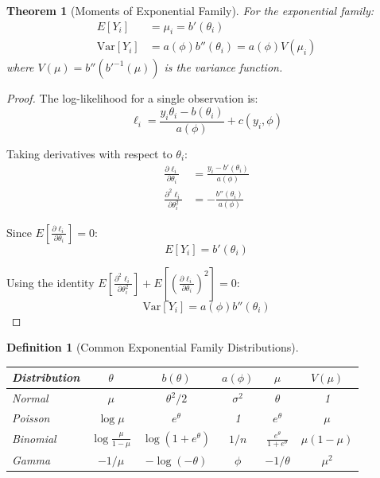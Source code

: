 \documentclass{article}
\newtheorem{definition}{Definition}
\newtheorem{theorem}{Theorem}
\begin{document}
\begin{theorem}[Moments of Exponential Family]
For the exponential family:
\begin{align}
E[Y_i] &= \mu_i = b'(\theta_i) \\
\text{Var}[Y_i] &= a(\phi)b''(\theta_i) = a(\phi)V(\mu_i)
\end{align}
where $V(\mu) = b''(b'^{-1}(\mu))$ is the variance function.
\end{theorem}

\begin{proof}
The log-likelihood for a single observation is:
\begin{equation}
\ell_i = \frac{y_i\theta_i - b(\theta_i)}{a(\phi)} + c(y_i, \phi)
\end{equation}

Taking derivatives with respect to $\theta_i$:
\begin{align}
\frac{\partial \ell_i}{\partial \theta_i} &= \frac{y_i - b'(\theta_i)}{a(\phi)} \\
\frac{\partial^2 \ell_i}{\partial \theta_i^2} &= -\frac{b''(\theta_i)}{a(\phi)}
\end{align}

Since $E\left[\frac{\partial \ell_i}{\partial \theta_i}\right] = 0$:
\begin{equation}
E[Y_i] = b'(\theta_i)
\end{equation}

Using the identity $E\left[\frac{\partial^2 \ell_i}{\partial \theta_i^2}\right] + E\left[\left(\frac{\partial \ell_i}{\partial \theta_i}\right)^2\right] = 0$:
\begin{equation}
\text{Var}[Y_i] = a(\phi)b''(\theta_i)
\end{equation}
\end{proof}

\begin{definition}[Common Exponential Family Distributions]
\begin{center}
\begin{tabular}{|l|c|c|c|c|c|}
\hline
Distribution & $\theta$ & $b(\theta)$ & $a(\phi)$ & $\mu$ & $V(\mu)$ \\
\hline
Normal & $\mu$ & $\theta^2/2$ & $\sigma^2$ & $\theta$ & 1 \\
Poisson & $\log\mu$ & $e^\theta$ & 1 & $e^\theta$ & $\mu$ \\
Binomial & $\log\frac{\mu}{1-\mu}$ & $\log(1+e^\theta)$ & $1/n$ & $\frac{e^\theta}{1+e^\theta}$ & $\mu(1-\mu)$ \\
Gamma & $-1/\mu$ & $-\log(-\theta)$ & $\phi$ & $-1/\theta$ & $\mu^2$ \\
\hline
\end{tabular}
\end{center}
\end{definition}
\end{document}
